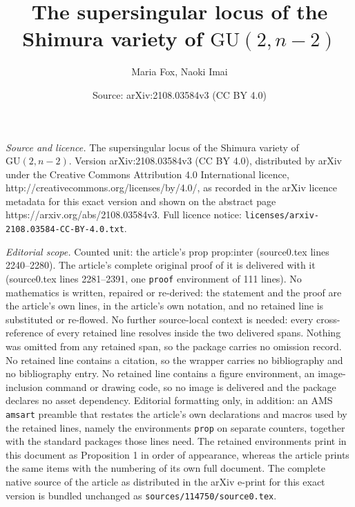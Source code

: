 \documentclass[10pt,a4paper]{amsart}
\title{The supersingular locus of the Shimura variety of $\mathrm{GU}(2,n-2)$}
\author{Maria Fox, Naoki Imai}
\date{Source: arXiv:2108.03584v3 (CC BY 4.0)}
\begin{document}
\maketitle

\noindent\emph{Source and licence.} The supersingular locus of the Shimura variety of $\mathrm{GU}(2,n-2)$. Version arXiv:2108.03584v3 (CC BY 4.0), distributed by arXiv under the Creative Commons Attribution 4.0 International licence, http://creativecommons.org/licenses/by/4.0/, as recorded in the arXiv licence metadata for this exact version and shown on the abstract page https://arxiv.org/abs/2108.03584v3. Full licence notice: \texttt{licenses/arxiv-2108.03584-CC-BY-4.0.txt}.\par\smallskip

\noindent\textit{Editorial scope.} Counted unit: the article's prop prop:inter (source0.tex lines 2240--2280). The article's complete original proof of it is delivered with it (source0.tex lines 2281--2391, one \texttt{proof} environment of 111 lines). No mathematics is written, repaired or re-derived: the statement and the proof are the article's own lines, in the article's own notation, and no retained line is substituted or re-flowed.  No further source-local context is needed: every cross-reference of every retained line resolves inside the two delivered spans.  Nothing was omitted from any retained span, so the package carries no omission record.  No retained line contains a citation, so the wrapper carries no bibliography and no bibliography entry.  No retained line contains a figure environment, an image-inclusion command or drawing code, so no image is delivered and the package declares no asset dependency.  Editorial formatting only, in addition: an AMS \texttt{amsart} preamble that restates the article's own declarations and macros used by the retained lines, namely the environments \texttt{prop} on separate counters, together with the standard packages those lines need.  The retained environments print in this document as Proposition 1 in order of appearance, whereas the article prints the same items with the numbering of its own full document.  The complete native source of the article as distributed in the arXiv e-print for this exact version is bundled unchanged as \texttt{sources/114750/source0.tex}.
\end{document}
